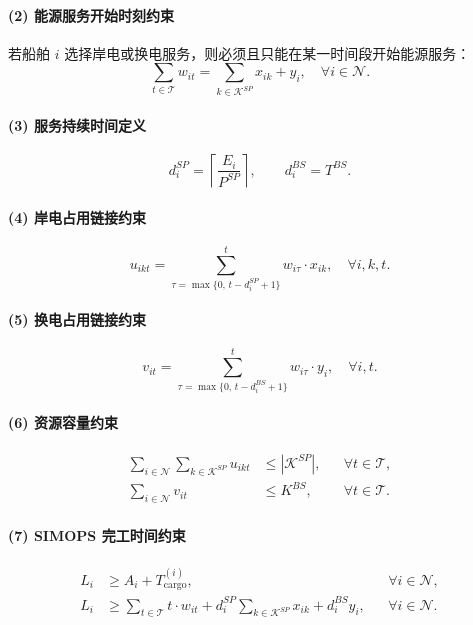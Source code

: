 \documentclass[UTF8, a4paper, 12pt]{ctexart}
\begin{document}
\paragraph{(2) 能源服务开始时刻约束}
若船舶 $i$ 选择岸电或换电服务，则必须且只能在某一时间段开始能源服务：
\begin{equation}
\sum_{t \in \mathcal{T}} w_{it}
=
\sum_{k \in \mathcal{K}^{SP}} x_{ik} + y_i,
\quad \forall i \in \mathcal{N}.
\label{eq:w_unique_24}
\end{equation}

\paragraph{(3) 服务持续时间定义}
\begin{equation}
d_i^{SP} = \left\lceil \frac{E_i}{P^{SP}} \right\rceil, 
\qquad
d_i^{BS} = T^{BS}.
\label{eq:duration_24}
\end{equation}

\paragraph{(4) 岸电占用链接约束}
\begin{equation}
u_{ikt}
=
\sum_{\tau = \max\{0,\, t-d_i^{SP}+1\}}^{t}
w_{i\tau} \cdot x_{ik},
\quad \forall i,k,t.
\label{eq:link_sp_24_final}
\end{equation}

\paragraph{(5) 换电占用链接约束}
\begin{equation}
v_{it}
=
\sum_{\tau = \max\{0,\, t-d_i^{BS}+1\}}^{t}
w_{i\tau} \cdot y_i,
\quad \forall i,t.
\label{eq:link_bs_24_final}
\end{equation}

\paragraph{(6) 资源容量约束}
\begin{align}
\sum_{i \in \mathcal{N}} \sum_{k \in \mathcal{K}^{SP}} u_{ikt}
&\le |\mathcal{K}^{SP}|,
&& \forall t \in \mathcal{T},
\label{eq:cap_sp_24_final} \\
\sum_{i \in \mathcal{N}} v_{it}
&\le K^{BS},
&& \forall t \in \mathcal{T}.
\label{eq:cap_bs_24_final}
\end{align}

\paragraph{(7) SIMOPS 完工时间约束}
\begin{align}
L_i &\ge A_i + T^{(i)}_{\text{cargo}},
&& \forall i \in \mathcal{N},
\label{eq:cargo_finish_24_final} \\
L_i &\ge 
\sum_{t \in \mathcal{T}} t \cdot w_{it}
+ d_i^{SP}\sum_{k \in \mathcal{K}^{SP}} x_{ik}
+ d_i^{BS} y_i,
&& \forall i \in \mathcal{N}.
\label{eq:service_finish_24_final}
\end{align}
\end{document}
